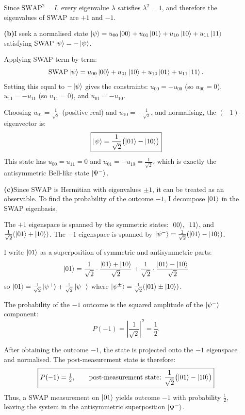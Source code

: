 \documentclass[12pt,a4paper]{article}
\begin{document}
Since $\mathrm{SWAP}^2 = I$, every eigenvalue $\lambda$ satisfies $\lambda^2 = 1$, and therefore the eigenvalues of $\mathrm{SWAP}$ are $+1$ and $-1$.

\medskip
\noindent\textbf{(b)}\enspace I seek a normalised state $\ket{\psi}=u_{00}\ket{00}+u_{01}\ket{01}+u_{10}\ket{10}+u_{11}\ket{11}$ satisfying $\mathrm{SWAP}\ket{\psi}=-\ket{\psi}$.

Applying SWAP term by term:
\[
  \mathrm{SWAP}\ket{\psi}
  = u_{00}\ket{00}+u_{01}\ket{10}+u_{10}\ket{01}+u_{11}\ket{11}.
\]
Setting this equal to $-\ket{\psi}$ gives the constraints:
$u_{00}=-u_{00}$ (so $u_{00}=0$),
$u_{11}=-u_{11}$ (so $u_{11}=0$),
and $u_{01}=-u_{10}$.

Choosing $u_{01}=\tfrac{1}{\sqrt{2}}$ (positive real) and $u_{10}=-\tfrac{1}{\sqrt{2}}$, and normalising, the $(-1)$-eigenvector is:
\[
  \boxed{\ket{\psi} = \frac{1}{\sqrt{2}}\bigl(\ket{01}-\ket{10}\bigr)}
\]
This state has $u_{00}=u_{11}=0$ and $u_{01}=-u_{10}=\tfrac{1}{\sqrt{2}}$, which is exactly the antisymmetric Bell-like state $\ket{\Psi^-}$.

\medskip
\noindent\textbf{(c)}\enspace Since $\mathrm{SWAP}$ is Hermitian with eigenvalues $\pm1$, it can be treated as an observable.
To find the probability of the outcome $-1$, I decompose $\ket{01}$ in the SWAP eigenbasis.

The $+1$ eigenspace is spanned by the symmetric states: $\ket{00}$, $\ket{11}$, and $\tfrac{1}{\sqrt{2}}(\ket{01}+\ket{10})$.
The $-1$ eigenspace is spanned by $\ket{\psi^-} = \tfrac{1}{\sqrt{2}}(\ket{01}-\ket{10})$.

I write $\ket{01}$ as a superposition of symmetric and antisymmetric parts:
\[
  \ket{01} = \frac{1}{\sqrt{2}}\cdot\frac{\ket{01}+\ket{10}}{\sqrt{2}}
           + \frac{1}{\sqrt{2}}\cdot\frac{\ket{01}-\ket{10}}{\sqrt{2}}
\]
so $\ket{01} = \tfrac{1}{\sqrt{2}}\ket{\psi^+}+\tfrac{1}{\sqrt{2}}\ket{\psi^-}$ where $\ket{\psi^\pm}=\tfrac{1}{\sqrt{2}}(\ket{01}\pm\ket{10})$.

The probability of the $-1$ outcome is the squared amplitude of the $\ket{\psi^-}$ component:
\[
  P(-1) = \left|\frac{1}{\sqrt{2}}\right|^2 = \frac{1}{2}.
\]

After obtaining the outcome $-1$, the state is projected onto the $-1$ eigenspace and normalised.
The post-measurement state is therefore:
\[
  \boxed{P(-1) = \tfrac{1}{2}, \qquad
  \text{post-measurement state: }\frac{1}{\sqrt{2}}\bigl(\ket{01}-\ket{10}\bigr)}
\]
Thus, a SWAP measurement on $\ket{01}$ yields outcome $-1$ with probability $\tfrac{1}{2}$, leaving the system in the antisymmetric superposition $\ket{\Psi^-}$.
\end{document}
